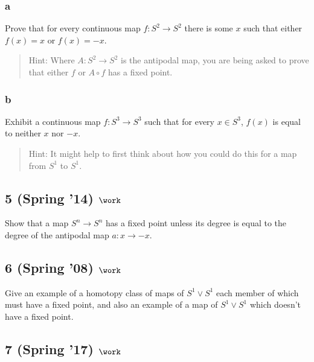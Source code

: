 \hypertarget{a-5}{%
\subsubsection{a}\label{a-5}}

Prove that for every continuous map \(f : S^2 \to S^2\) there is some
\(x\) such that either \(f (x) = x\) or \(f (x) = -x\).

\begin{quote}
Hint: Where \(A : S^2 \to S^2\) is the antipodal map, you are being
asked to prove that either \(f\) or \(A \circ f\) has a fixed point.
\end{quote}

\hypertarget{b-5}{%
\subsubsection{b}\label{b-5}}

Exhibit a continuous map \(f : S^3 \to S^3\) such that for every
\(x \in S^3\), \(f (x)\) is equal to neither \(x\) nor \(-x\).

\begin{quote}
Hint: It might help to first think about how you could do this for a map
from \(S^1\) to \(S^1\).
\end{quote}

\hypertarget{spring-14-work-3}{%
\subsection{\texorpdfstring{5 (Spring '14)
\(\work\)}{5 (Spring '14) \textbackslash work}}\label{spring-14-work-3}}

Show that a map \(S^n \to S^n\) has a fixed point unless its degree is
equal to the degree of the antipodal map \(a : x \to -x\).

\hypertarget{spring-08-work-3}{%
\subsection{\texorpdfstring{6 (Spring '08)
\(\work\)}{6 (Spring '08) \textbackslash work}}\label{spring-08-work-3}}

Give an example of a homotopy class of maps of \(S^1 \lor S^1\) each
member of which must have a fixed point, and also an example of a map of
\(S^1 \lor S^1\) which doesn't have a fixed point.

\hypertarget{spring-17-work-2}{%
\subsection{\texorpdfstring{7 (Spring '17)
\(\work\)}{7 (Spring '17) \textbackslash work}}\label{spring-17-work-2}}

